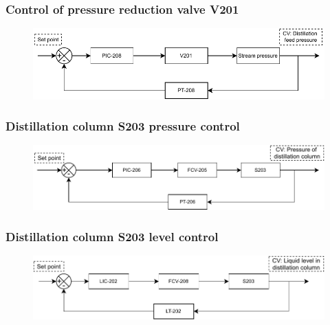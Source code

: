 \subsubsection{Control of pressure reduction valve V201}
\begin{figure}[H]
    \centering
    \includegraphics[width=\linewidth]{chapters/4-operation-control/4-Figures/V201-PC.pdf}
    \caption{}
    \label{fig:V201-PC}
\end{figure}

\subsubsection{Distillation column S203 pressure control}
\begin{figure}[H]
    \centering
    \includegraphics[width=\linewidth]{chapters/4-operation-control/4-Figures/S203-PC.pdf}
    \caption{}
    \label{fig:S203-PC}
\end{figure}


\subsubsection{Distillation column S203 level control}
\begin{figure}[H]
    \centering
    \includegraphics[width=\linewidth]{chapters/4-operation-control/4-Figures/S203-LC.pdf}
    \caption{}
    \label{fig:S203-LC}
\end{figure}

